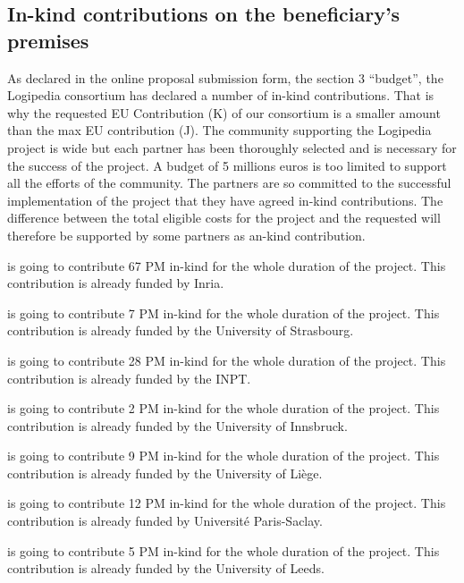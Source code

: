 \subsection*{In-kind contributions on the beneficiary’s premises}

As declared in the online proposal submission form, the section 3
``budget'', the Logipedia consortium has declared a number of in-kind
contributions. That is why the requested EU Contribution (K) of our
consortium is a smaller amount than the max EU contribution (J). The
community supporting the Logipedia project is wide but each partner
has been thoroughly selected and is necessary for the success of the
project.
A budget of 5 millions euros is too limited to support all
the efforts of the community.
The partners are so committed to the successful implementation of the
project that they have agreed in-kind contributions.
The difference between the total
eligible costs for the project and the requested will therefore be
supported by some partners as an-kind contribution.

 is going to contribute
67 PM in-kind for the whole duration of the project.
This contribution is already funded by Inria.

 is going to contribute 7 PM in-kind for the whole duration of the project.
This contribution is already funded by the University of Strasbourg.

 is going to contribute 28 PM in-kind for the whole duration of the project.
This contribution is already funded by the INPT.

 is going to contribute 2 PM in-kind for the whole duration of the project.
This contribution is already funded by the University of Innsbruck.

 is going to contribute 9 PM in-kind for the whole duration of the project.
This contribution is already funded by the University of Liège.

 is going to contribute 12 PM in-kind for the whole duration of the project.
This contribution is already funded by Université Paris-Saclay.

 is going to contribute 5 PM in-kind for the whole duration of the project.
This contribution is already funded by the University of Leeds.

